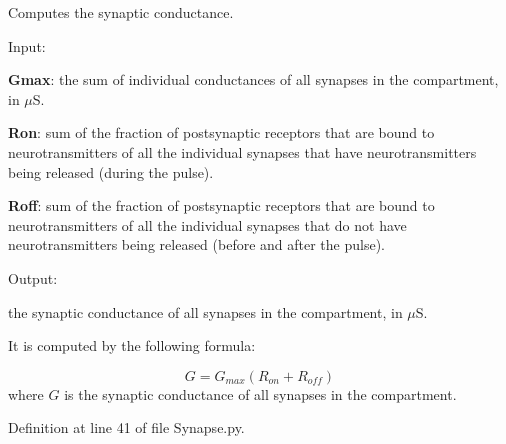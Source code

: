 Computes the synaptic conductance. 


\begin{DoxyItemize}
\item Input\+:
\begin{DoxyItemize}
\item {\bfseries Gmax}\+: the sum of individual conductances of all synapses in the compartment, in $\mu$S.
\item {\bfseries Ron}\+: sum of the fraction of postsynaptic receptors that are bound to neurotransmitters of all the individual synapses that have neurotransmitters being released (during the pulse).
\item {\bfseries Roff}\+: sum of the fraction of postsynaptic receptors that are bound to neurotransmitters of all the individual synapses that do not have neurotransmitters being released (before and after the pulse).
\end{DoxyItemize}
\item Output\+:
\begin{DoxyItemize}
\item the synaptic conductance of all synapses in the compartment, in $\mu$S.
\end{DoxyItemize}
\end{DoxyItemize}

It is computed by the following formula\+:

\begin{equation} G = G_{max}(R_{on} + R_{off}) \end{equation} where $G$ is the synaptic conductance of all synapses in the compartment. 

Definition at line 41 of file Synapse.\+py.

